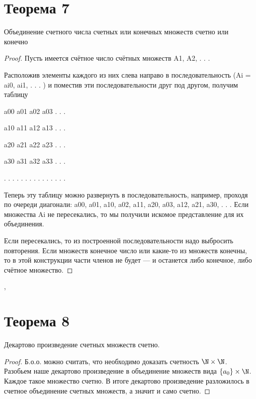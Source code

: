 \documentclass[a4paper,12pt]{article}
\begin{document}
    \section {Теорема 7}
    \begin{theorem}
   
Объединение счетного числа счетных или конечных множеств счетно или конечно
    \end{theorem}
    \begin{proof}
    
    Пусть имеется счётное число счётных множеств A1, A2, . . .
    
Расположив элементы каждого из них слева направо в последовательность (Ai = {ai0, ai1, . . . }) и поместив эти последовательности друг под другом, получим таблицу

a00 a01 a02 a03 . . .

a10 a11 a12 a13 . . .

a20 a21 a22 a23 . . .

a30 a31 a32 a33 . . .

. . . . . . . . . . . . . . .

Теперь эту таблицу можно развернуть в последовательность, например, проходя по очереди диагонали:
a00, a01, a10, a02, a11, a20, a03, a12, a21, a30, . . .
Если множества Ai не пересекались, то мы получили искомое представление для их объединения. 

Если пересекались, то из построенной последовательности надо выбросить повторения.
Если множеств конечное число или какие-то из множеств конечны, то в этой конструкции части членов не будет — и останется либо конечное, либо счётное множество.
    
    \end{proof}

\sep
    \section{Теорема 8}
    
    \begin{theorem}
        Декартово произведение счетных множеств счетно.
    \end{theorem}
    \begin{proof}
        Б.о.о. можно считать, что необходимо доказать счетность $\N \times \N$. Разобьем наше декартово произведение в объединение множеств вида $ \{a_0\} \times \N $. Каждое такое множество счетно. В итоге декартово произведение разложилось в счетное объединение счетных множеств, а значит и само счетно.
    \end{proof}
\end{document}
